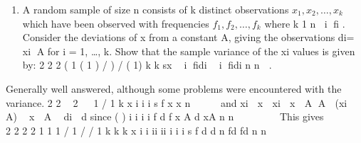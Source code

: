 \documentclass[a4paper,12pt]{article}
\begin{document}
\begin{enumerate}

\item 
A random sample of size n consists of k distinct observations $x_1, x_2, \ldots, x_k$ which have
been observed with frequencies $f_1, f_2, \ldots, f_k$ where k 1
n i fi . Consider the
deviations of x from a constant A, giving the observations di= xi A for i = 1, …, k.
Show that the sample variance of the xi values is given by:
  2 2 2
( 1 ( 1 ) / ) / ( 1) k k
sx  i fidi  i fidi n n  .
\end{enumerate}
\newpage

Generally well answered, although some problems were encountered with the variance.
2 2  2  
1
/ 1
k
x i i
i
s f x x n

  
and xi  x  xi  x  A A  (xi  A)  x  A  di  d
since
( )
i i i i f d f x A
d xA
n n

     
This gives      
2
2 2 2
1 1 1
/ 1 / / 1
k k k
x i i ii ii
i i i
s f d d n fd fd n n
  
                    
  
\end{document}
